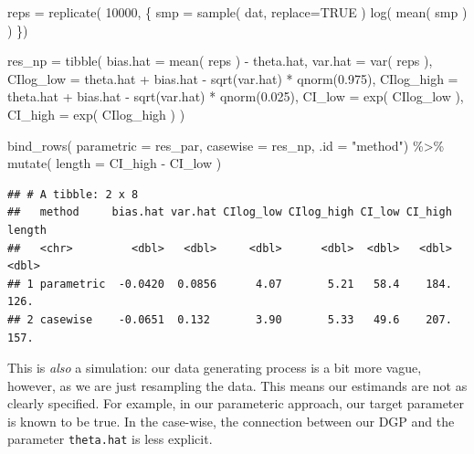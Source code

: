 \documentclass[
]{book}
\newenvironment{Shaded}{\begin{snugshade}}{\end{snugshade}}
\newcommand{\AttributeTok}[1]{\textcolor[rgb]{0.77,0.63,0.00}{#1}}
\newcommand{\ConstantTok}[1]{\textcolor[rgb]{0.00,0.00,0.00}{#1}}
\newcommand{\DecValTok}[1]{\textcolor[rgb]{0.00,0.00,0.81}{#1}}
\newcommand{\FloatTok}[1]{\textcolor[rgb]{0.00,0.00,0.81}{#1}}
\newcommand{\FunctionTok}[1]{\textcolor[rgb]{0.00,0.00,0.00}{#1}}
\newcommand{\NormalTok}[1]{#1}
\newcommand{\OtherTok}[1]{\textcolor[rgb]{0.56,0.35,0.01}{#1}}
\newcommand{\SpecialCharTok}[1]{\textcolor[rgb]{0.00,0.00,0.00}{#1}}
\newcommand{\StringTok}[1]{\textcolor[rgb]{0.31,0.60,0.02}{#1}}
\begin{document}
\begin{Shaded}
\begin{Highlighting}[]
\NormalTok{reps }\OtherTok{=} \FunctionTok{replicate}\NormalTok{( }\DecValTok{10000}\NormalTok{, \{}
\NormalTok{    smp }\OtherTok{=} \FunctionTok{sample}\NormalTok{( dat, }\AttributeTok{replace=}\ConstantTok{TRUE}\NormalTok{ )}
    \FunctionTok{log}\NormalTok{( }\FunctionTok{mean}\NormalTok{( smp ) )}
\NormalTok{\})}

\NormalTok{res\_np }\OtherTok{=} \FunctionTok{tibble}\NormalTok{( }
  \AttributeTok{bias.hat =} \FunctionTok{mean}\NormalTok{( reps ) }\SpecialCharTok{{-}}\NormalTok{ theta.hat,}
  \AttributeTok{var.hat =} \FunctionTok{var}\NormalTok{( reps ),}
  \AttributeTok{CIlog\_low =}\NormalTok{ theta.hat }\SpecialCharTok{+}\NormalTok{ bias.hat }\SpecialCharTok{{-}} \FunctionTok{sqrt}\NormalTok{(var.hat) }\SpecialCharTok{*} \FunctionTok{qnorm}\NormalTok{(}\FloatTok{0.975}\NormalTok{),}
  \AttributeTok{CIlog\_high =}\NormalTok{ theta.hat }\SpecialCharTok{+}\NormalTok{ bias.hat }\SpecialCharTok{{-}} \FunctionTok{sqrt}\NormalTok{(var.hat) }\SpecialCharTok{*} \FunctionTok{qnorm}\NormalTok{(}\FloatTok{0.025}\NormalTok{),}
  \AttributeTok{CI\_low =} \FunctionTok{exp}\NormalTok{( CIlog\_low ),}
  \AttributeTok{CI\_high =} \FunctionTok{exp}\NormalTok{( CIlog\_high ) )}


\FunctionTok{bind\_rows}\NormalTok{( }\AttributeTok{parametric =}\NormalTok{ res\_par, }
           \AttributeTok{casewise =}\NormalTok{ res\_np, }\AttributeTok{.id =} \StringTok{"method"}\NormalTok{) }\SpecialCharTok{\%\textgreater{}\%}
  \FunctionTok{mutate}\NormalTok{( }\AttributeTok{length =}\NormalTok{ CI\_high }\SpecialCharTok{{-}}\NormalTok{ CI\_low )}
\end{Highlighting}
\end{Shaded}

\begin{verbatim}
## # A tibble: 2 x 8
##   method     bias.hat var.hat CIlog_low CIlog_high CI_low CI_high length
##   <chr>         <dbl>   <dbl>     <dbl>      <dbl>  <dbl>   <dbl>  <dbl>
## 1 parametric  -0.0420  0.0856      4.07       5.21   58.4    184.   126.
## 2 casewise    -0.0651  0.132       3.90       5.33   49.6    207.   157.
\end{verbatim}

This is \emph{also} a simulation: our data generating process is a bit more vague, however, as we are just resampling the data.
This means our estimands are not as clearly specified.
For example, in our parameteric approach, our target parameter is known to be true.
In the case-wise, the connection between our DGP and the parameter \texttt{theta.hat} is less explicit.
\end{document}
